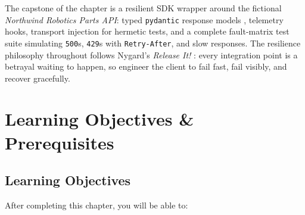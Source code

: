 The capstone of the chapter is a resilient SDK wrapper around the fictional
\emph{Northwind Robotics Parts API}: typed \texttt{pydantic} response models
\cite{pydanticdocs}, telemetry hooks, transport injection for hermetic tests,
and a complete fault-matrix test suite simulating \texttt{500}s, \texttt{429}s
with \texttt{Retry-After}, and slow responses. The resilience philosophy
throughout follows Nygard's \emph{Release It!} \cite{nygard2018releaseit}:
every integration point is a betrayal waiting to happen, so engineer the
client to fail fast, fail visibly, and recover gracefully.


\section{Learning Objectives \& Prerequisites}

\subsection{Learning Objectives}

After completing this chapter, you will be able to:

